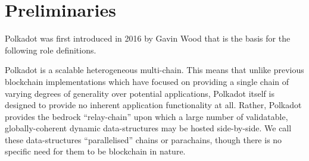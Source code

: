 \section{Preliminaries}\label{sec:preliminiary}

Polkadot was first introduced in 2016 by Gavin Wood \cite{2016:Wood:Polkadot} that is the basis for the following role definitions.




Polkadot is a scalable heterogeneous multi-chain. This means that unlike previous blockchain implementations which have focused on providing a single chain of varying degrees of generality over potential applications, Polkadot itself is designed to provide no inherent application functionality at all. Rather, Polkadot provides the bedrock “relay-chain” upon which a large number of validatable, globally-coherent dynamic data-structures may be hosted side-by-side.
We call these data-structures “parallelised” chains or parachains, though there is no specific need for them to be blockchain in nature. %




